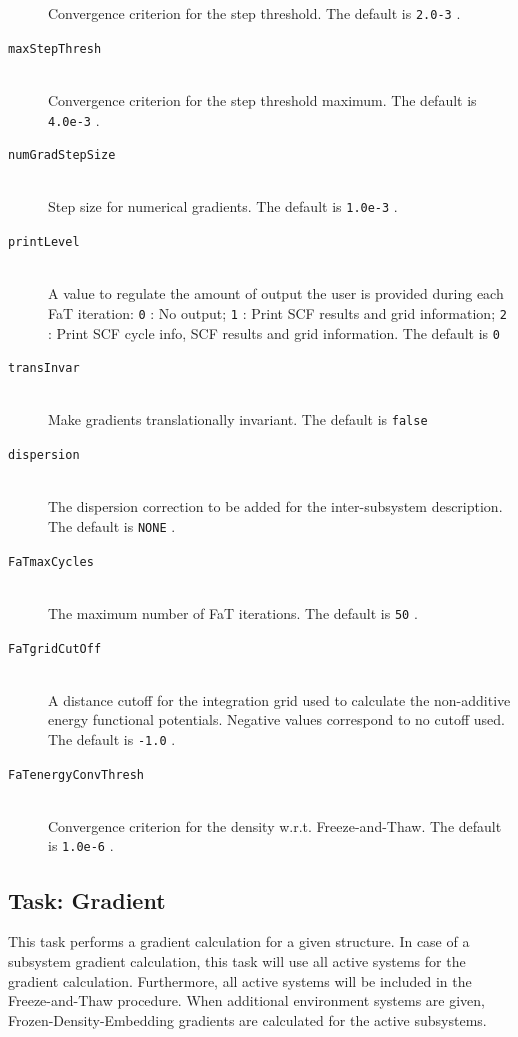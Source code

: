 \documentclass[bibliography=totocnumbered,a4paper,10pt,oneside]{scrbook}
\newcommand{\ttt}[1]{%
  \begingroup\setlength{\fboxsep}{1pt}%
  \colorbox{serenity-green!30}{\texttt{\hspace*{2pt}\vphantom{(g}#1\hspace*{2pt}}}%
  \endgroup
}
\begin{document}
\begin{description}
  Convergence criterion for the step threshold. The default is \ttt{2.0-3}. 
 \item [\texttt{maxStepThresh}]\hfill \\
  Convergence criterion for the step threshold maximum. The default is \ttt{4.0e-3}. 
 \item [\texttt{numGradStepSize}]\hfill \\
  Step size for numerical gradients. The default is \ttt{1.0e-3}. 
 \item [\texttt{printLevel}]\hfill \\
  A value to regulate the amount of output the user is provided during each FaT iteration:
  \ttt{0}: No output; \ttt{1}: Print SCF results and grid information; \ttt{2}: Print SCF cycle info, SCF results and grid information. The default is \ttt{0}
 \item [\texttt{transInvar}]\hfill \\
    Make gradients translationally invariant. The default is \ttt{false}
 \item [\texttt{dispersion}]\hfill \\
    The dispersion correction to be added for the inter-subsystem description. The default is \ttt{NONE}.
 \item [\texttt{FaTmaxCycles}]\hfill \\
   The maximum number of FaT iterations. The default is \ttt{50}.
 \item [\texttt{FaTgridCutOff}]\hfill \\
  A distance cutoff for the integration grid used to calculate the non-additive energy functional potentials. Negative values correspond to no cutoff used. The default is \ttt{-1.0}.
 \item [\texttt{FaTenergyConvThresh}]\hfill \\
 Convergence criterion for the density w.r.t. Freeze-and-Thaw. The default is \ttt{1.0e-6}.
\end{description}


\subsection{Task: Gradient}
This task performs a gradient calculation for a given structure. In case of a subsystem gradient calculation, this task will use all active systems for the gradient calculation. Furthermore, all active systems will be included in the Freeze-and-Thaw procedure. When additional environment systems are given, Frozen-Density-Embedding gradients are calculated for the active subsystems.
\end{document}
